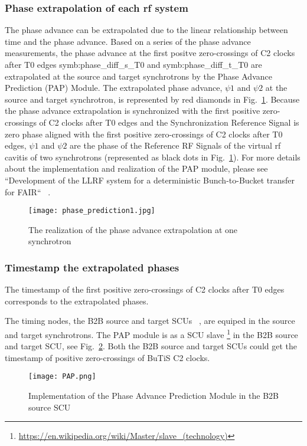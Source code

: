 \subsubsection{Phase extrapolation of each rf system}
The phase advance can be extrapolated due to the linear relationship between time and the phase advance. Based on a series of the phase advance measurements, the phase advance at the first positve zero-crossings of C2 clocks after T0 edges \gls{symb:phase_diff_s_T0} and \gls{symb:phase_diff_t_T0} are extrapolated at the source and target synchrotrons by the Phase Advance Prediction (\gls{PAP}) Module. The extrapolated phase advance, $\psi1$ and $\psi2$ at the source and target synchrotron, is represented by red diamonds in Fig.~\ref{phase_prediction1}. Because the phase advance extrapolation is synchronized with the first positive zero-crossings of C2 clocks after T0 edges and the Synchronization Reference Signal is zero phase aligned with the first positive zero-crossings of C2 clocks after T0 edges, $\psi1$ and $\psi2$ are the phase of the Reference RF Signals of the virtual rf cavitis of two synchrotrons (represented as black dots in Fig.~\ref{phase_prediction1}). For more details about the implementation and realization of the PAP module, please see ``Development of the LLRF system for a deterministic Bunch-to-Bucket transfer for FAIR`` ~\cite{ferrand_development_????}.   
\begin{figure}[H]
   \centering   
   \texttt{[image: phase\_prediction1.jpg]}
   \caption{The realization of the phase advance extrapolation at one synchrotron}
   \label{phase_prediction1}
\end{figure}
\subsubsection{Timestamp the extrapolated phases}
The timestamp of the first positive zero-crossings of C2 clocks after T0 edges corresponds to the extrapolated phases. 

The timing nodes, the B2B source and target SCUs ~\cite{beck_new_2012, thieme_scu_2013}, are equiped in the source and target synchrotrons. The PAP module is as a SCU slave \footnote{\url{https://en.wikipedia.org/wiki/Master/slave_(technology)}} in the B2B source and target SCU, see Fig.~\ref{PAP}. Both the B2B source and target SCUs could get the timestamp of positive zero-crossings of \gls{BuTiS} C2 clocks. 
 \begin{figure}[!htb]
   \centering   
   \texttt{[image: PAP.png]}
   \caption{Implementation of the Phase Advance Prediction Module in the B2B source SCU}
   \label{PAP}
\end{figure}

